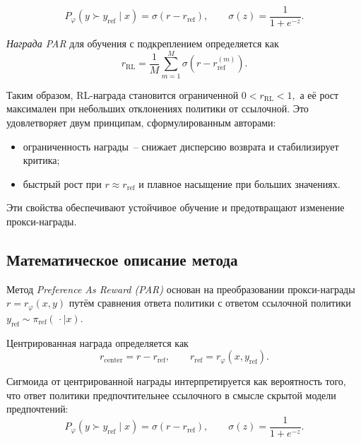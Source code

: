 \begin{equation}
\label{eq:bt-preference}
    P_\varphi( y \succ y_{\mathrm{ref}} \mid x )
    =
    \sigma\!\left( r - r_{\mathrm{ref}} \right),
    \qquad 
    \sigma(z)=\frac{1}{1+e^{-z}} .
\end{equation}

\begin{definition}
    \label{def:par_short}
    \emph{Награда PAR} для обучения с подкреплением определяется как
    \begin{equation}
        r_{\mathrm{RL}}
        =
        \frac{1}{M}
        \sum_{m=1}^M
        \sigma\!\left(
            r - r_{\mathrm{ref}}^{(m)}
        \right).
    \end{equation}
\end{definition}

Таким образом, RL-награда становится ограниченной
$ 0 < r_{\mathrm{RL}} < 1, $ а её рост максимален при небольших отклонениях 
политики от ссылочной. Это удовлетворяет двум принципам, сформулированным авторами:

\begin{itemize}
    \item ограниченность награды~-- снижает дисперсию возврата и стабилизирует 
    критика;
    \item быстрый рост при $r \approx r_{\mathrm{ref}}$ и плавное насыщение 
    при больших значениях.
\end{itemize}

Эти свойства обеспечивают устойчивое обучение и предотвращают
изменение прокси-награды.


\subsection{Математическое описание метода}

Метод \emph{Preference As Reward (PAR)} основан на преобразовании прокси-награды 
$r = r_\varphi(x,y)$ путём сравнения ответа политики с ответом ссылочной политики 
$y_{\mathrm{ref}} \sim \pi_{\mathrm{ref}}(\,\cdot\mid x)$.
    
Центрированная награда определяется как
    \begin{equation}
        r_{\mathrm{center}} = r - r_{\mathrm{ref}},
        \qquad 
        r_{\mathrm{ref}} = r_\varphi(x, y_{\mathrm{ref}}).
    \end{equation}

Сигмоида от центрированной награды интерпретируется как вероятность того,
что ответ политики предпочтительнее ссылочного в смысле скрытой модели предпочтений:
\begin{equation}
    P_\varphi\!\left(y \succ y_{\mathrm{ref}} \mid x\right)
    =
    \sigma\!\left( r - r_{\mathrm{ref}} \right),
    \qquad 
    \sigma(z)=\frac{1}{1+e^{-z}} .
\end{equation}

